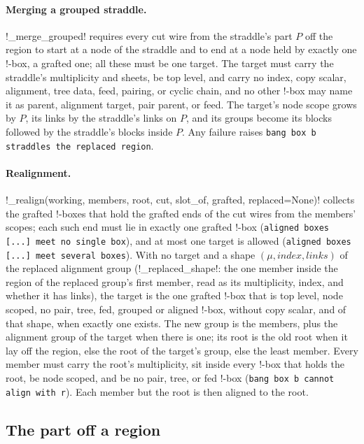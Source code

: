\paragraph{Merging a grouped straddle.} \py!_merge_grouped! requires every cut wire from the straddle's part $P$ off the region to start at a node of the straddle and to end at a node held by exactly one !-box, a grafted one; all these must be one target. The target must carry the straddle's multiplicity and sheets, be top level, and carry no index, copy scalar, alignment, tree data, feed, pairing, or cyclic chain, and no other !-box may name it as parent, alignment target, pair parent, or feed. The target's node scope grows by $P$, its links by the straddle's links on $P$, and its groups become its blocks followed by the straddle's blocks inside $P$. Any failure raises \texttt{bang box b straddles the replaced region}.

\paragraph{Realignment.} \py!_realign(working, members, root, cut, slot_of, grafted, replaced=None)! collects the grafted !-boxes that hold the grafted ends of the cut wires from the members' scopes; each such end must lie in exactly one grafted !-box (\texttt{aligned boxes [.\allowbreak{}.\allowbreak{}.\allowbreak{}] meet no single box}), and at most one target is allowed (\texttt{aligned boxes [.\allowbreak{}.\allowbreak{}.\allowbreak{}] meet several boxes}). With no target and a shape $(\mu,\mathit{index},\mathit{links})$ of the replaced alignment group (\py!_replaced_shape!: the one member inside the region of the replaced group's first member, read as its multiplicity, index, and whether it has links), the target is the one grafted !-box that is top level, node scoped, no pair, tree, fed, grouped or aligned !-box, without copy scalar, and of that shape, when exactly one exists. The new group is the members, plus the alignment group of the target when there is one; its root is the old root when it lay off the region, else the root of the target's group, else the least member. Every member must carry the root's multiplicity, sit inside every !-box that holds the root, be node scoped, and be no pair, tree, or fed !-box (\texttt{bang box b cannot align with r}). Each member but the root is then aligned to the root.

\subsection{The part off a region}\label{sec:kernel-copy-side}

